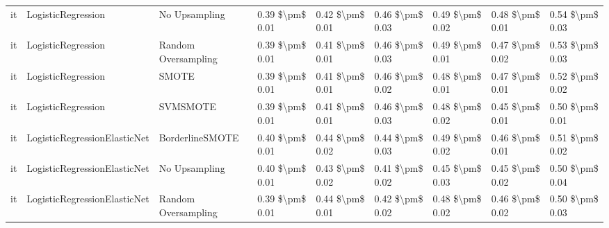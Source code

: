 \begin{tabular}{lllllllll}
      it &              LogisticRegression &                 No Upsampling & 0.39 \$\textbackslash pm\$ 0.01 &           0.42 \$\textbackslash pm\$ 0.01 &       0.46 \$\textbackslash pm\$ 0.03 &        0.49 \$\textbackslash pm\$ 0.02 &                         0.48 \$\textbackslash pm\$ 0.01 &     0.54 \$\textbackslash pm\$ 0.03 \\
      it &              LogisticRegression &           Random Oversampling & 0.39 \$\textbackslash pm\$ 0.01 &           0.41 \$\textbackslash pm\$ 0.01 &       0.46 \$\textbackslash pm\$ 0.03 &        0.49 \$\textbackslash pm\$ 0.01 &                         0.47 \$\textbackslash pm\$ 0.02 &     0.53 \$\textbackslash pm\$ 0.03 \\
      it &              LogisticRegression &                         SMOTE & 0.39 \$\textbackslash pm\$ 0.01 &           0.41 \$\textbackslash pm\$ 0.01 &       0.46 \$\textbackslash pm\$ 0.02 &        0.48 \$\textbackslash pm\$ 0.01 &                         0.47 \$\textbackslash pm\$ 0.01 &     0.52 \$\textbackslash pm\$ 0.02 \\
      it &              LogisticRegression &                      SVMSMOTE & 0.39 \$\textbackslash pm\$ 0.01 &           0.41 \$\textbackslash pm\$ 0.01 &       0.46 \$\textbackslash pm\$ 0.03 &        0.48 \$\textbackslash pm\$ 0.02 &                         0.45 \$\textbackslash pm\$ 0.01 &     0.50 \$\textbackslash pm\$ 0.01 \\
      it &    LogisticRegressionElasticNet &               BorderlineSMOTE & 0.40 \$\textbackslash pm\$ 0.01 &           0.44 \$\textbackslash pm\$ 0.02 &       0.44 \$\textbackslash pm\$ 0.03 &        0.49 \$\textbackslash pm\$ 0.02 &                         0.46 \$\textbackslash pm\$ 0.01 &     0.51 \$\textbackslash pm\$ 0.02 \\
      it &    LogisticRegressionElasticNet &                 No Upsampling & 0.40 \$\textbackslash pm\$ 0.01 &           0.43 \$\textbackslash pm\$ 0.02 &       0.41 \$\textbackslash pm\$ 0.02 &        0.45 \$\textbackslash pm\$ 0.03 &                         0.45 \$\textbackslash pm\$ 0.02 &     0.50 \$\textbackslash pm\$ 0.04 \\
      it &    LogisticRegressionElasticNet &           Random Oversampling & 0.39 \$\textbackslash pm\$ 0.01 &           0.44 \$\textbackslash pm\$ 0.01 &       0.42 \$\textbackslash pm\$ 0.02 &        0.48 \$\textbackslash pm\$ 0.02 &                         0.46 \$\textbackslash pm\$ 0.02 &     0.50 \$\textbackslash pm\$ 0.03 \\

\end{tabular}
